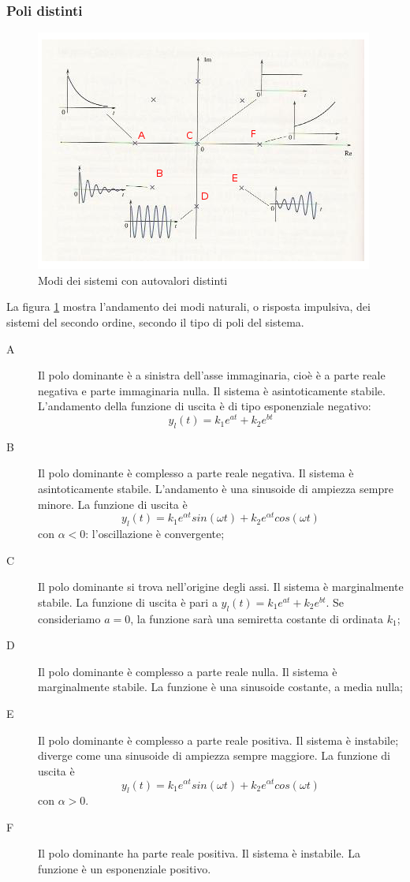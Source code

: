 \documentclass[a4paper]{report}
\begin{document}
\subsubsection{Poli distinti}
\begin{figure}[!h]
  \begin{center}
    \includegraphics[scale=0.7]{./figures/modisingol.png}
    \caption{Modi dei sistemi con autovalori distinti}\label{fig:modising}
  \end{center}
\end{figure} 
La figura \ref{fig:modising} mostra l'andamento dei modi naturali, o
risposta impulsiva, dei sistemi del secondo ordine, secondo il tipo di
poli del sistema.

\begin{description}
\item[A] Il polo dominante \`e a sinistra dell'asse immaginaria,
  cio\`e \`e a parte reale negativa e parte immaginaria
  nulla. Il sistema \`e asintoticamente stabile. L'andamento della
  funzione di uscita \`e di tipo esponenziale negativo:
  \[
  y_l(t) = k_1 e^{at} + k_2 e^{bt}
  \]
\item[B] Il polo dominante \`e complesso a parte reale negativa. Il sistema \`e
  asintoticamente stabile. L'andamento \`e una sinusoide di ampiezza
  sempre minore. La funzione di uscita \`e
  \[
  y_l(t) = k_1 e^{\alpha t}sin(\omega t) + k_2 e^{\alpha t}cos(\omega t)
  \]
  con $\alpha < 0$: l'oscillazione \`e convergente;
\item[C] Il polo dominante si trova nell'origine degli assi. Il
  sistema \`e marginalmente stabile. La funzione di uscita \`e pari a
  $y_l(t) = k_1 e^{at} + k_2 e^{bt}$. Se consideriamo $a = 0$, la
  funzione sar\`a una semiretta costante di ordinata $k_1$;
\item[D] Il polo dominante \`e complesso a parte reale nulla. Il
  sistema \`e marginalmente stabile. La funzione \`e una sinusoide
  costante, a media nulla;
\item[E] Il polo dominante \`e complesso a parte reale positiva. Il
  sistema \`e instabile; diverge come una sinusoide di ampiezza sempre
  maggiore. La funzione di uscita \`e
  \[
  y_l(t) = k_1 e^{\alpha t}sin(\omega t) + k_2 e^{\alpha t}cos(\omega t)
  \]
  con $\alpha > 0$.
\item[F] Il polo dominante ha parte reale positiva. Il sistema \`e
  instabile. La funzione \`e un esponenziale positivo.
\end{description}
\end{document}
